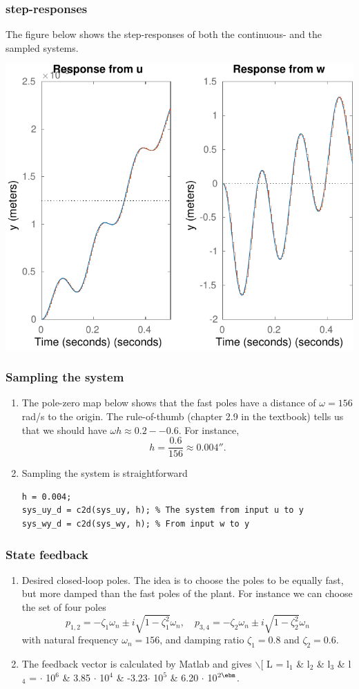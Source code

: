 \documentclass[a4paper]{scrartcl}
\begin{document}
\subsubsection*{step-responses}
\label{sec-3-2-2}
The figure below shows the step-responses of both the continuous- and the sampled systems.
\begin{center}
\includegraphics[width=0.6\linewidth]{active-susp-plant-response}
\end{center}

\subsubsection*{Sampling the system}
\label{sec-3-2-3}
\begin{enumerate}
\item The pole-zero map below shows that the fast poles have a distance of \(\omega = 156\) rad/s to the origin. The rule-of-thumb (chapter 2.9 in the textbook) tells us that we should have \(\omega h \approx 0.2 -- 0.6\). For instance,
\[ h = \frac{0.6}{156} \approx \unit{0.004}{\second}. \]
\item Sampling the system is straightforward 
\begin{verbatim}
h = 0.004;
sys_uy_d = c2d(sys_uy, h); % The system from input u to y
sys_wy_d = c2d(sys_wy, h); % From input w to y
\end{verbatim}
\end{enumerate}
\subsubsection*{State feedback}
\label{sec-3-2-4}
\begin{enumerate}
\item Desired closed-loop poles. The idea is to choose the poles to be equally fast, but more damped than the fast poles of the plant. For instance we can choose the set of four poles  
\[ p_{1,2} = -\zeta_1\omega_n \pm i \sqrt{1 - \zeta_1^2}\omega_n,  \quad
               p_{3,4} = -\zeta_2\omega_n \pm i \sqrt{1 - \zeta_2^2}\omega_n \]
with natural frequency \(\omega_n = 156\), and damping ratio \(\zeta_1 = 0.8\) and \(\zeta_2 = 0.6\).
\item The feedback vector is calculated by Matlab and gives
$\backslash$[ L = \bbm l$_{\text{1}}$ \& l$_{\text{2}}$ \& l$_{\text{3}}$ \& l$_{\text{4}}$ \ebm = $\cdot$ 10$^{\text{6}}$ \& 3.85 $\cdot$ 10$^{\text{4}}$ \& -3.23$\cdot$ 10$^{\text{5}}$ \& 6.20 $\cdot$ 10$^{\text{2}\ebm}$.
\end{enumerate}
\end{document}
